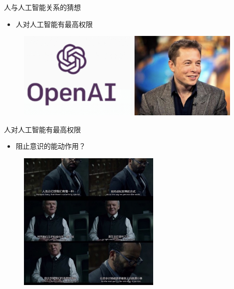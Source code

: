 \documentclass{beamer}
\begin{document}
 \begin{frame}{人与人工智能关系的猜想}
    \begin{itemize}
     \item  人对人工智能有最高权限
    \end{itemize}

   \begin{figure}[H]
   \centering
   \includegraphics[width=4.3in]{gtyPic2.jpg}
   \end{figure}

  \end{frame}

 \begin{frame}{人对人工智能有最高权限}
    \begin{itemize}
     \item  阻止意识的能动作用？
    \end{itemize}

   \begin{figure}[H]
   \centering
   \includegraphics[height=2.65in]{gtyPic3.jpg}
   \end{figure}

  \end{frame}
\end{document}

